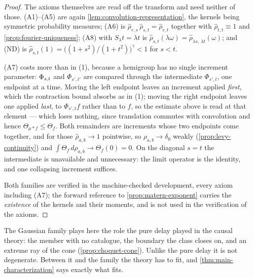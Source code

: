 \begin{proof}
The axioms themselves are read off the transform and need neither of those. (A1)--(A5) are again
\ref{lem:convolution-representation}, the kernels being symmetric probability measures; (A6) is
$\hat\rho_{r,s}\,\hat\rho_{s,t} = \hat\rho_{r,t}$ together with $\hat\rho_{t,t} \equiv 1$ and
\ref{prop:fourier-uniqueness}; (A8) with $S_\lambda t = \lambda t$ is
$\hat\rho_{s,t}(\lambda\omega) = \hat\rho_{\lambda s,\,\lambda t}(\omega)$; and (ND) is
$\hat\rho_{s,t}(1) = \bigl((1+s^2)/(1+t^2)\bigr)^{\gamma} < 1$ for $s < t$.

(A7) costs more than in (1), because a hemigroup has no single increment parameter: $\Phi_{s,t}$
and $\Phi_{s',t'}$ are compared through the intermediate $\Phi_{s',t}$, one endpoint at a time.
Moving the left endpoint leaves an increment applied \emph{first}, which the contraction bound
absorbs as in (1); moving the right endpoint leaves one applied \emph{last}, to $\Phi_{s',t}f$
rather than to $f$, so the estimate above is read at that element --- which loses nothing, since
translation commutes with convolution and hence $\Theta_{\mu * f} \le \Theta_f$. Both remainders
are increments whose two endpoints come together, and for those $\hat\rho_{a,b} \to 1$
pointwise, so $\rho_{a,b} \to \delta_0$ weakly (\ref{prop:levy-continuity}) and
$\int \Theta_f\,d\rho_{a,b} \to \Theta_f(0) = 0$. On the diagonal $s = t$ the intermediate is
unavailable and unnecessary: the limit operator is the identity, and one collapsing increment
suffices.

Both families are verified in the machine-checked development, every axiom including (A7); the
forward reference to \ref{prop:matern-exponent} carries the \emph{existence} of the \Matern{}
kernels and their moments, and is not used in the verification of the axioms.
\end{proof}

The Gaussian family plays here the role the pure delay played in the causal theory: the member
with no catalogue, the boundary the class closes on, and an extreme ray of the cone
(\ref{prop:choquet-cone}). Unlike the pure delay it is not degenerate. Between it and the
\Matern{} family the theory has to fit, and \ref{thm:main-characterization} says exactly what
fits.

